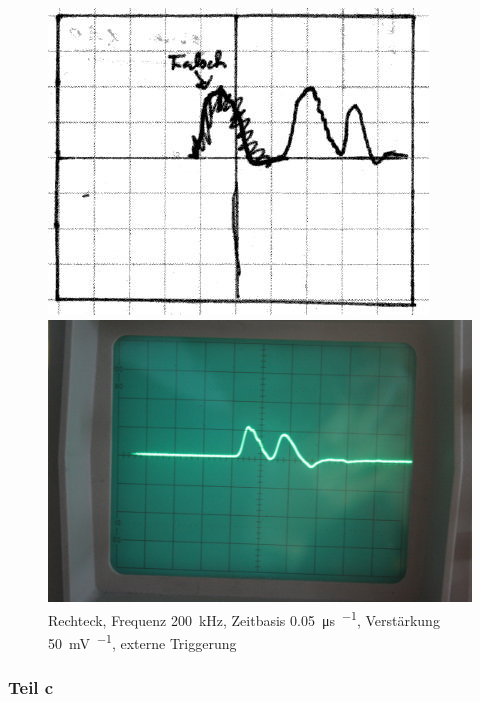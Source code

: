 \begin{figure}
	\centering
	\begin{minipage}{.45\linewidth}
	\includegraphics[width=\linewidth]{Skizzen/IMG_0766-1500.jpg}
	\end{minipage}
	\hfill
	\begin{minipage}{.45\linewidth}
	\includegraphics[width=\linewidth]{Fotos/IMG_0766-1500.jpg}
	\end{minipage}
	\caption{%
		Rechteck, Frequenz \SI{200}{\kilo\hertz},
		Zeitbasis \SI{.05}{\micro\second\per\division},
		Verstärkung \SI{50}{\milli\volt\per\division},
		externe Triggerung
	}
	\label{fig:0766}
\end{figure}

\FloatBarrier
\subsubsection{Teil c}

